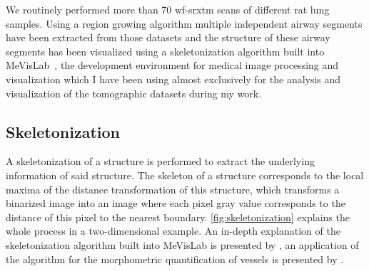We routinely performed more than 70 \ac{wf-srxtm} scans of different rat lung samples. Using a region growing algorithm multiple independent airway segments have been extracted from those datasets and the structure of these airway segments has been visualized using a skeletonization algorithm built into MeVisLab~\cite{Bitter2007}, the development environment for medical image processing and visualization which I have been using almost exclusively for the analysis and visualization of the tomographic datasets during my work.

\subsection{Skeletonization}
A skeletonization of a structure is performed to extract the underlying information of said structure. The skeleton of a structure corresponds to the local maxima of the distance transformation of this structure, which transforms a binarized image into an image where each pixel gray value corresponds to the distance of this pixel to the nearest boundary. \autoref{fig:skeletonization} explains the whole process in a two-dimensional example. An in-depth explanation of the skeletonization algorithm built into MeVisLab is presented by \citet{Selle2002}, an application of the algorithm for the morphometric quantification of vessels is presented by \citet{Boskamp2004}.


